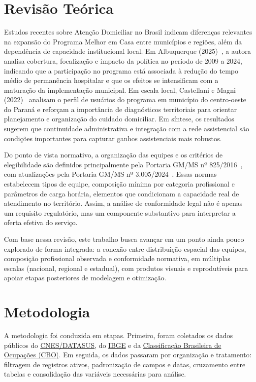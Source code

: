 \documentclass[12pt]{article}
\DeclareRobustCommand{\citelink}[2]{#2~\cite{#1}}
\begin{document}
\section{Revisão Teórica}

Estudos recentes sobre Atenção Domiciliar no Brasil indicam diferenças relevantes na expansão do Programa Melhor em Casa entre municípios e regiões, além da dependência de capacidade institucional local. Em \citelink{albuquerque2025}{Albuquerque (2025)}, a autora analisa cobertura, focalização e impacto da política no período de 2009 a 2024, indicando que a participação no programa está associada à redução do tempo médio de permanência hospitalar e que os efeitos se intensificam com a maturação da implementação municipal. Em escala local, \citelink{castellani2022}{Castellani e Magni (2022)} analisam o perfil de usuários do programa em município do centro-oeste do Paraná e reforçam a importância de diagnósticos territoriais para orientar planejamento e organização do cuidado domiciliar. Em síntese, os resultados sugerem que continuidade administrativa e integração com a rede assistencial são condições importantes para capturar ganhos assistenciais mais robustos.

Do ponto de vista normativo, a organização das equipes e os critérios de elegibilidade são definidos principalmente pela \citelink{portaria825}{Portaria GM/MS nº 825/2016}, com atualizações pela \citelink{portaria3005}{Portaria GM/MS nº 3.005/2024}. Essas normas estabelecem tipos de equipe, composição mínima por categoria profissional e parâmetros de carga horária, elementos que condicionam a capacidade real de atendimento no território. Assim, a análise de conformidade legal não é apenas um requisito regulatório, mas um componente substantivo para interpretar a oferta efetiva do serviço.

Com base nessa revisão, este trabalho busca avançar em um ponto ainda pouco explorado de forma integrada: a conexão entre distribuição espacial das equipes, composição profissional observada e conformidade normativa, em múltiplas escalas (nacional, regional e estadual), com produtos visuais e reprodutíveis para apoiar etapas posteriores de modelagem e otimização.

\section{Metodologia}

A metodologia foi conduzida em etapas. Primeiro, foram coletados os dados públicos do \href{https://cnes.datasus.gov.br/pages/downloads/arquivosBaseDados.jsp}{CNES/DATASUS}, do \href{https://www.ibge.gov.br/estatisticas/sociais/populacao/22827-censo-demografico-2022.html}{IBGE} e da \href{http://www.mtecbo.gov.br/cbosite/pages/downloads.jsf}{Classificação Brasileira de Ocupações (CBO)}. Em seguida, os dados passaram por organização e tratamento: filtragem de registros ativos, padronização de campos e datas, cruzamento entre tabelas e consolidação das variáveis necessárias para análise.
\end{document}
